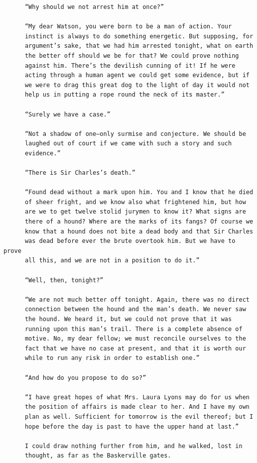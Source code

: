 \documentclass{article}
\begin{document}
\begin{verbatim}
      “Why should we not arrest him at once?”

      “My dear Watson, you were born to be a man of action. Your
      instinct is always to do something energetic. But supposing, for
      argument’s sake, that we had him arrested tonight, what on earth
      the better off should we be for that? We could prove nothing
      against him. There’s the devilish cunning of it! If he were
      acting through a human agent we could get some evidence, but if
      we were to drag this great dog to the light of day it would not
      help us in putting a rope round the neck of its master.”

      “Surely we have a case.”

      “Not a shadow of one—only surmise and conjecture. We should be
      laughed out of court if we came with such a story and such
      evidence.”

      “There is Sir Charles’s death.”

      “Found dead without a mark upon him. You and I know that he died
      of sheer fright, and we know also what frightened him, but how
      are we to get twelve stolid jurymen to know it? What signs are
      there of a hound? Where are the marks of its fangs? Of course we
      know that a hound does not bite a dead body and that Sir Charles
      was dead before ever the brute overtook him. But we have to prove
      all this, and we are not in a position to do it.”

      “Well, then, tonight?”

      “We are not much better off tonight. Again, there was no direct
      connection between the hound and the man’s death. We never saw
      the hound. We heard it, but we could not prove that it was
      running upon this man’s trail. There is a complete absence of
      motive. No, my dear fellow; we must reconcile ourselves to the
      fact that we have no case at present, and that it is worth our
      while to run any risk in order to establish one.”

      “And how do you propose to do so?”

      “I have great hopes of what Mrs. Laura Lyons may do for us when
      the position of affairs is made clear to her. And I have my own
      plan as well. Sufficient for tomorrow is the evil thereof; but I
      hope before the day is past to have the upper hand at last.”

      I could draw nothing further from him, and he walked, lost in
      thought, as far as the Baskerville gates.


\end{verbatim}
\end{document}

